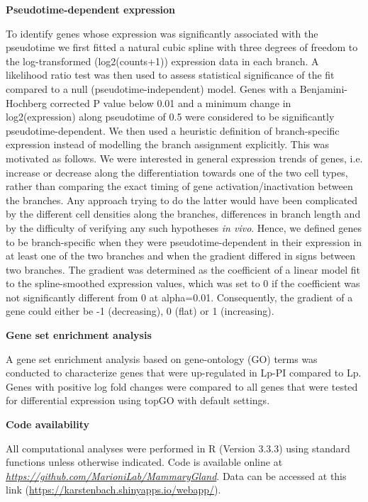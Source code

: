 \documentclass[titlepage, 12pt, oneside]{amsart}
\begin{document}
\textbf{Pseudotime-dependent expression}

To identify genes whose expression was significantly associated with the pseudotime we first fitted a natural cubic spline with three degrees of freedom to the log-transformed (log2(counts+1)) expression data in each branch.
A likelihood ratio test was then used to assess statistical significance of the fit compared to a null (pseudotime-independent) model.
Genes with a Benjamini-Hochberg corrected P value below 0.01 and a minimum change in log2(expression) along pseudotime of 0.5 were considered to be significantly pseudotime-dependent.
We then used a heuristic definition of branch-specific expression instead of modelling the branch assignment explicitly.
This was motivated as follows.
We were interested in general expression trends of genes, i.e. increase or decrease along the differentiation towards one of the two cell types, rather than comparing the exact timing of gene activation/inactivation between the branches.
Any approach trying to do the latter would have been complicated by the different cell densities along the branches, differences in branch length and by the difficulty of verifying any such hypotheses \textit{in vivo}.
Hence, we defined genes to be branch-specific when they were pseudotime-dependent in their expression in at least one of the two branches and when the gradient differed in signs between two branches.
The gradient was determined as the coefficient of a linear model fit to the spline-smoothed expression values, which was set to 0 if the coefficient was not significantly different from 0 at alpha=0.01.
Consequently, the gradient of a gene could either be -1 (decreasing), 0 (flat) or 1 (increasing).

\textbf{Gene set enrichment analysis}

A gene set enrichment analysis based on gene-ontology (GO) terms was conducted to characterize genes that were up-regulated in Lp-PI compared to Lp.
Genes with positive log fold changes were compared to all genes that were tested for differential expression using topGO with default settings\autocite{Alexa2016}.

\textbf{Code availability}

All computational analyses were performed in R (Version 3.3.3) using standard functions unless otherwise indicated.
Code is available online at \href{https://github.com/MarioniLab/MammaryGland}{\textit{https://github.com/MarioniLab/MammaryGland}}.
Data can be accessed at this link (\url{https://karstenbach.shinyapps.io/webapp/}).
\end{document}
